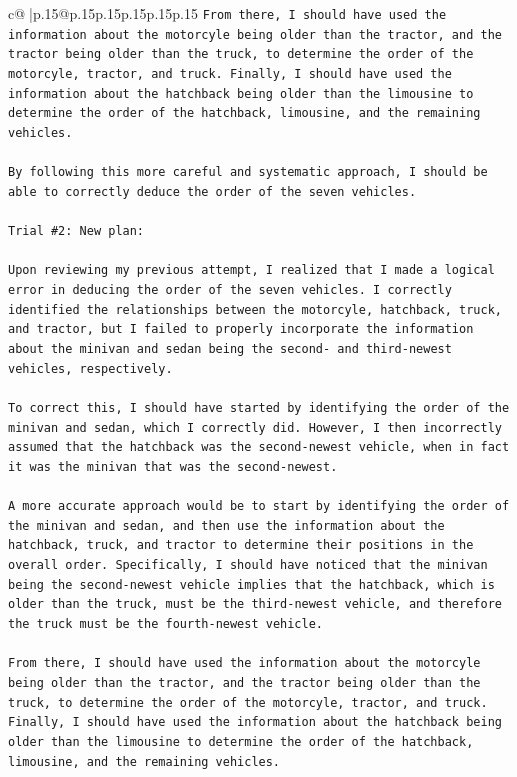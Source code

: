 \documentclass{article}
\begin{document}
{\begin{supertabular}{c@{$\;$}|p{.15\linewidth}@{}p{.15\linewidth}p{.15\linewidth}p{.15\linewidth}p{.15\linewidth}p{.15\linewidth}}
{{{\texttt{From there, I should have used the information about the motorcyle being older than the tractor, and the tractor being older than the truck, to determine the order of the motorcyle, tractor, and truck. Finally, I should have used the information about the hatchback being older than the limousine to determine the order of the hatchback, limousine, and the remaining vehicles.} \\
\\ 
\texttt{By following this more careful and systematic approach, I should be able to correctly deduce the order of the seven vehicles.} \\
\\ 
\texttt{Trial \#2: New plan: } \\
\\ 
\texttt{Upon reviewing my previous attempt, I realized that I made a logical error in deducing the order of the seven vehicles. I correctly identified the relationships between the motorcyle, hatchback, truck, and tractor, but I failed to properly incorporate the information about the minivan and sedan being the second{-} and third{-}newest vehicles, respectively.} \\
\\ 
\texttt{To correct this, I should have started by identifying the order of the minivan and sedan, which I correctly did. However, I then incorrectly assumed that the hatchback was the second{-}newest vehicle, when in fact it was the minivan that was the second{-}newest.} \\
\\ 
\texttt{A more accurate approach would be to start by identifying the order of the minivan and sedan, and then use the information about the hatchback, truck, and tractor to determine their positions in the overall order. Specifically, I should have noticed that the minivan being the second{-}newest vehicle implies that the hatchback, which is older than the truck, must be the third{-}newest vehicle, and therefore the truck must be the fourth{-}newest vehicle.} \\
\\ 
\texttt{From there, I should have used the information about the motorcyle being older than the tractor, and the tractor being older than the truck, to determine the order of the motorcyle, tractor, and truck. Finally, I should have used the information about the hatchback being older than the limousine to determine the order of the hatchback, limousine, and the remaining vehicles.} \\
}}}
\end{supertabular}}
\end{document}
